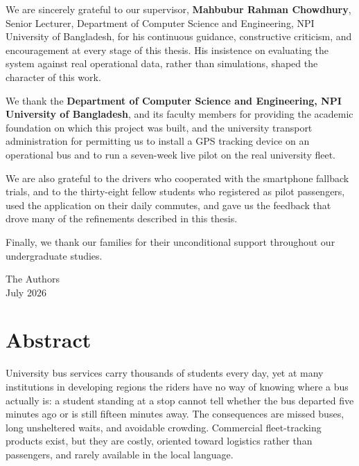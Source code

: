 We are sincerely grateful to our supervisor, \textbf{Mahbubur Rahman
Chowdhury}, Senior Lecturer, Department of Computer Science and
Engineering, NPI University of Bangladesh, for his continuous guidance,
constructive criticism, and encouragement at every stage of this thesis.
His insistence on evaluating the system against real operational data,
rather than simulations, shaped the character of this work.

We thank the \textbf{Department of Computer Science and Engineering, NPI
University of Bangladesh}, and its faculty members for providing the
academic foundation on which this project was built, and the university
transport administration for permitting us to install a GPS tracking
device on an operational bus and to run a seven-week live pilot on the
real university fleet.

We are also grateful to the drivers who cooperated with the smartphone
fallback trials, and to the thirty-eight fellow students who registered as
pilot passengers, used the application on their daily commutes, and gave
us the feedback that drove many of the refinements described in this
thesis.

Finally, we thank our families for their unconditional support throughout
our undergraduate studies.

\vspace{1.2cm}
\noindent The Authors\\
July 2026
\clearpage

\chapter*{Abstract}
\thispagestyle{plain}

University bus services carry thousands of students every day, yet at many
institutions in developing regions the riders have no way of knowing where
a bus actually is: a student standing at a stop cannot tell whether the
bus departed five minutes ago or is still fifteen minutes away. The
consequences are missed buses, long unsheltered waits, and avoidable
crowding. Commercial fleet-tracking products exist, but they are costly,
oriented toward logistics rather than passengers, and rarely available in
the local language.

